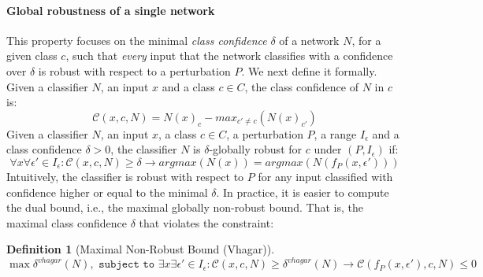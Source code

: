 \documentclass[11pt]{article}
\newtheorem{definition}{Definition}
\begin{document}
\paragraph{Global robustness of a single network}
This property focuses on the minimal \emph{class confidence} $\delta$ of a network $N$, for a given class $c$, such that \emph{every} input that the network classifies with a confidence over $\delta$ is robust with respect to a perturbation $P$. We next define it formally.
Given a classifier $N$, an input $x$ and a class $c\in{C}$, the class confidence of $N$ in $c$ is:
$$\mathcal{C}(x,c,N)=N(x)_{c}-max_{c'\ne c}(N(x)_{c'})$$
Given a classifier $N$, an input $x$, a class $c\in{C}$, a perturbation $P$, a range $I_\epsilon$ and a class confidence $\delta>0$, the classifier $N$ is $\delta$-globally robust for $c$ under $(P,I_\epsilon)$ if:\\
$$\forall{x}\forall{\epsilon'}\in{I_\epsilon}:    \mathcal{C}(x,c,N) \geq \delta \rightarrow argmax(N(x)) = argmax(N(f_P(x,\epsilon'))) $$
Intuitively, the classifier is robust with respect to $P$ for any input classified with confidence higher or equal to the minimal $\delta$. In practice, it is easier to compute the dual bound, i.e., the maximal globally non-robust bound. That is, the maximal class confidence $\delta$ that violates the constraint:
\begin{definition}[Maximal Non-Robust Bound (Vhagar)]\label{def:vhagar}
$$\max{\delta^{vhagar}(N)}, \texttt{ subject to } \exists{x}\exists{\epsilon'}\in{I_\epsilon}: \mathcal{C}(x,c,N) \geq \delta^{vhagar}(N) \rightarrow \mathcal{C}(f_P(x,\epsilon'),c,N)\leq 0$$
\end{definition}
\end{document}
